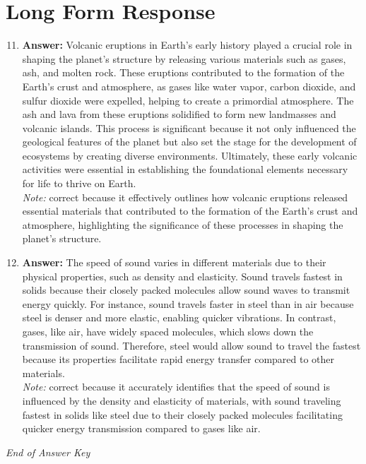 \documentclass[12pt]{article}
\begin{document}
\section*{Long Form Response}
\begin{enumerate}[label=\arabic*.]
\setcounter{enumi}{10}
\item \textbf{Answer:} Volcanic eruptions in Earth's early history played a crucial role in shaping the planet's structure by releasing various materials such as gases, ash, and molten rock. These eruptions contributed to the formation of the Earth's crust and atmosphere, as gases like water vapor, carbon dioxide, and sulfur dioxide were expelled, helping to create a primordial atmosphere. The ash and lava from these eruptions solidified to form new landmasses and volcanic islands. This process is significant because it not only influenced the geological features of the planet but also set the stage for the development of ecosystems by creating diverse environments. Ultimately, these early volcanic activities were essential in establishing the foundational elements necessary for life to thrive on Earth.
\\ \textit{Note:} correct because it effectively outlines how volcanic eruptions released essential materials that contributed to the formation of the Earth's crust and atmosphere, highlighting the significance of these processes in shaping the planet's structure.
\item \textbf{Answer:} The speed of sound varies in different materials due to their physical properties, such as density and elasticity. Sound travels fastest in solids because their closely packed molecules allow sound waves to transmit energy quickly. For instance, sound travels faster in steel than in air because steel is denser and more elastic, enabling quicker vibrations. In contrast, gases, like air, have widely spaced molecules, which slows down the transmission of sound. Therefore, steel would allow sound to travel the fastest because its properties facilitate rapid energy transfer compared to other materials.
\\ \textit{Note:} correct because it accurately identifies that the speed of sound is influenced by the density and elasticity of materials, with sound traveling fastest in solids like steel due to their closely packed molecules facilitating quicker energy transmission compared to gases like air.
\end{enumerate}

\vfill
\noindent\textit{End of Answer Key}
\end{document}

